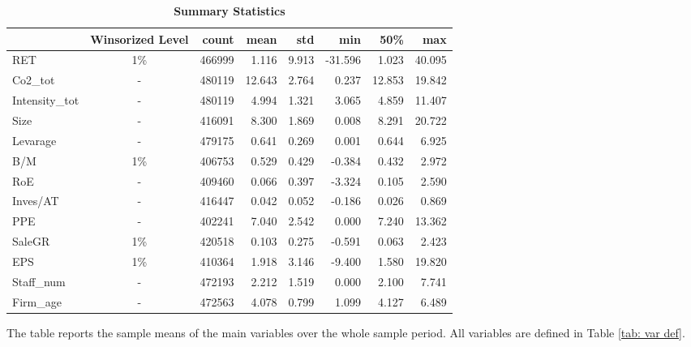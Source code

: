 \documentclass[12pt]{article}
\begin{document}
\begin{table}[!ht]
\centering
\footnotesize
\caption{\textbf{Summary Statistics}}
\label{tab: summ stats}
\begin{tabular}{lcrrrrrr}
\toprule
{} &  Winsorized Level &    count &   mean &   std &     min &    50\% &    max \\
\midrule
RET      & 1\%    & 466999 &  1.116 & 9.913 & -31.596 &  1.023 & 40.095 \\
Co2\_tot   &  -  & 480119 & 12.643 & 2.764 &   0.237 & 12.853 & 19.842 \\
Intensity\_tot &  - & 480119 &  4.994 & 1.321 &   3.065 &  4.859 & 11.407 \\
Size     &  -   & 416091 &  8.300 & 1.869 &   0.008 &  8.291 & 20.722 \\
Levarage  &  -  & 479175 &  0.641 & 0.269 &   0.001 &  0.644 &  6.925 \\
B/M       &  1\%  & 406753 &  0.529 & 0.429 &  -0.384 &  0.432 &  2.972 \\
RoE       &  -  & 409460 &  0.066 & 0.397 &  -3.324 &  0.105 &  2.590 \\
Inves/AT  &  -  & 416447 &  0.042 & 0.052 &  -0.186 &  0.026 &  0.869 \\
PPE       &  -  & 402241 &  7.040 & 2.542 &   0.000 &  7.240 & 13.362 \\
SaleGR    &  1\%  & 420518 &  0.103 & 0.275 &  -0.591 &  0.063 &  2.423 \\
EPS       &  1\%  & 410364 &  1.918 & 3.146 &  -9.400 &  1.580 & 19.820 \\
Staff\_num  & -  & 472193 &  2.212 & 1.519 &   0.000 &  2.100 &  7.741 \\
Firm\_age   & -  & 472563 &  4.078 & 0.799 &   1.099 &  4.127 &  6.489 \\
\bottomrule

\end{tabular}
\begin{tablenotes}
    \item The table reports the sample means of the main variables over the whole sample period. All variables are defined in Table \ref{tab: var def}.
\end{tablenotes}
\end{table}
\end{document}
